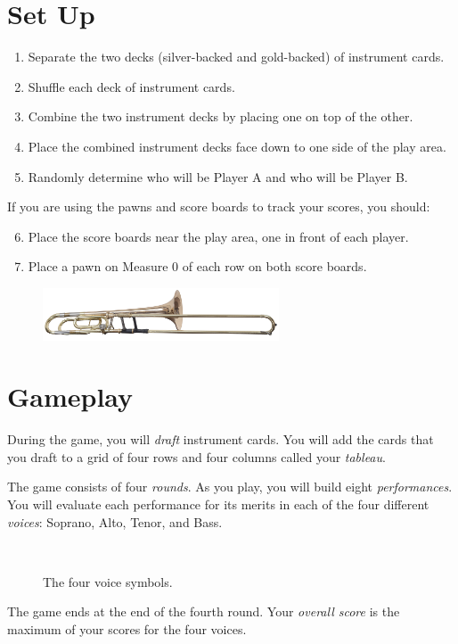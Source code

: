 \documentclass[a6paper, 12pt, parskip=half, DIV=14]{scrartcl}
\begin{document}
\section*{Set Up}
\begin{enumerate}[leftmargin=4ex]
  \item Separate the two decks (silver-backed and gold-backed) of instrument cards. 
  \item Shuffle each deck of instrument cards.
  \item Combine the two instrument decks by placing one on top of the other.
  \item Place the combined instrument decks face down to one side of the play area.
  \item Randomly determine who will be Player A and who will be Player B.
 \end{enumerate}
 If you are using the pawns and score boards to track your scores, you should:
\begin{enumerate}[leftmargin=4ex]
  \setcounter{enumi}{5}
  \item Place the score boards near the play area, one in front of each player.
  \item Place a pawn on Measure 0 of each row on both score boards. 
\end{enumerate}

\vfill

\begin{figure}[h]
\centering
\includegraphics[width=7cm]{Images/shutterstock_trombone2.jpg}
\end{figure}


\newpage
\enlargethispage{1.75\baselineskip}
\section*{Gameplay}
During the game, you will \emph{draft} instrument cards. You will add the cards that you draft to a grid of four rows and four columns called your \emph{tableau}.

The game consists of four \emph{rounds}. As you play, you will build eight \emph{performances}.
You will evaluate each performance for its merits in each of the four different \emph{voices}: Soprano, Alto, Tenor, and Bass.
{

\begin{figure}[h]
\centering
\Huge
{} \ \  \ \  \ \ 
\caption*{The four voice symbols.}
\end{figure}
}
The game ends at the end of the fourth round. Your \emph{overall score} is the maximum of your scores for the four voices.
\end{document}
